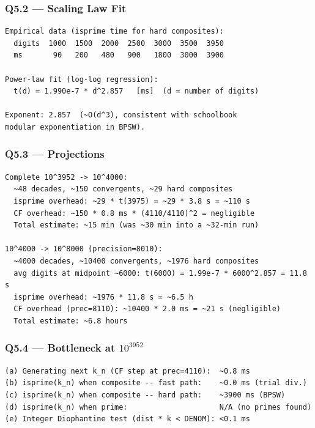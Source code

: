 \documentclass[11pt,a4paper]{article}
\begin{document}
\subsubsection*{Q5.2 --- Scaling Law Fit}

\begin{lstlisting}
Empirical data (isprime time for hard composites):
  digits  1000  1500  2000  2500  3000  3500  3950
  ms       90   200   480   900   1800  3000  3900

Power-law fit (log-log regression):
  t(d) = 1.990e-7 * d^2.857   [ms]  (d = number of digits)

Exponent: 2.857  (~O(d^3), consistent with schoolbook
modular exponentiation in BPSW).
\end{lstlisting}

\subsubsection*{Q5.3 --- Projections}

\begin{lstlisting}
Complete 10^3952 -> 10^4000:
  ~48 decades, ~150 convergents, ~29 hard composites
  isprime overhead: ~29 * t(3975) = ~29 * 3.8 s = ~110 s
  CF overhead: ~150 * 0.8 ms * (4110/4110)^2 = negligible
  Total estimate: ~15 min (was ~30 min into a ~32-min run)

10^4000 -> 10^8000 (precision=8010):
  ~4000 decades, ~10400 convergents, ~1976 hard composites
  avg digits at midpoint ~6000: t(6000) = 1.99e-7 * 6000^2.857 = 11.8 s
  isprime overhead: ~1976 * 11.8 s = ~6.5 h
  CF overhead (prec=8110): ~10400 * 2.0 ms = ~21 s (negligible)
  Total estimate: ~6.8 hours
\end{lstlisting}

\subsubsection*{Q5.4 --- Bottleneck at $10^{3952}$}

\begin{lstlisting}
(a) Generating next k_n (CF step at prec=4110):  ~0.8 ms
(b) isprime(k_n) when composite -- fast path:    ~0.0 ms (trial div.)
(c) isprime(k_n) when composite -- hard path:    ~3900 ms (BPSW)
(d) isprime(k_n) when prime:                     N/A (no primes found)
(e) Integer Diophantine test (dist * k < DENOM): <0.1 ms
\end{lstlisting}

\end{document}
